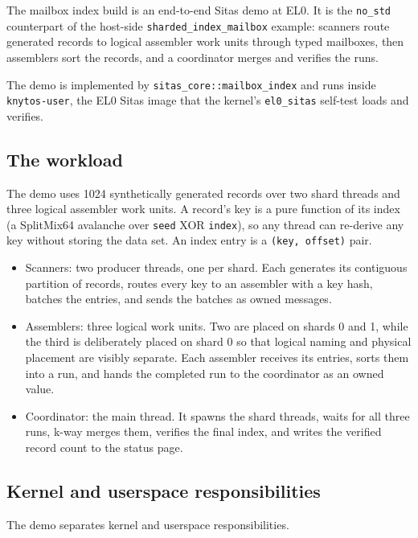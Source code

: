 The mailbox index build is an end-to-end Sitas demo at EL0. It is the
\texttt{no\_std} counterpart of the host-side \texttt{sharded\_index\_mailbox}
example: scanners route generated records to logical assembler work units through
typed mailboxes, then assemblers sort the records, and a coordinator merges and verifies
the runs.

The demo is implemented by \texttt{sitas\_core::mailbox\_index} and runs inside
\texttt{knytos-user}, the EL0 Sitas image that the
kernel's \texttt{el0\_sitas} self-test loads and verifies.

\subsection{The workload}

The demo uses 1024 synthetically generated records over two shard threads 
and three logical assembler work units. A record's key is a pure function of its 
index (a SplitMix64 avalanche over \texttt{seed} XOR \texttt{index}), so any 
thread can re-derive any key without storing the data set. An index entry is 
a \texttt{(key, offset)} pair.

\begin{itemize}
    \item Scanners: two producer threads, one per shard. Each
        generates its contiguous partition of records, routes every key to
        an assembler with a key hash, batches the entries, and sends the
        batches as owned messages.
    \item Assemblers: three logical work units. Two are placed
        on shards 0 and 1, while the third is deliberately placed on shard 0 so
        that logical naming and physical placement are visibly separate.
        Each assembler receives its entries, sorts them into a run, and
        hands the completed run to the coordinator as an owned value.
    \item Coordinator: the main thread. It spawns the shard
        threads, waits for all three runs, k-way merges them, verifies the
        final index, and writes the verified record count to the status
        page.
\end{itemize}

\subsection{Kernel and userspace responsibilities}

The demo separates kernel and userspace responsibilities.

